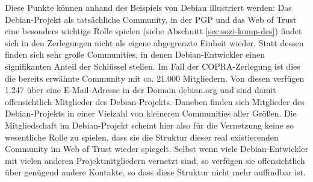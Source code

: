 Diese Punkte können anhand des Beispiels von Debian illustriert
werden: Das Debian-Projekt als tatsächliche Community, in der PGP
und das Web of Trust eine besonders wichtige Rolle spielen (siehe
Abschnitt \ref{sec:sozi-komp-des}) findet sich in den Zerlegungen
nicht als eigene abgegrenzte Einheit wieder. Statt dessen finden sich
sehr große Communities, in denen Debian-Entwickler einen signifikanten
Anteil der Schlüssel stellen. Im Fall der COPRA-Zerlegung ist dies
die bereits erwähnte Community mit ca. 21.000 Mitgliedern. Von
diesen verfügen 1.247 über eine E-Mail-Adresse in der Domain
debian.org und sind damit offensichtlich Mitglieder des
Debian-Projekts. Daneben finden sich Mitglieder des Debian-Projekts in
einer Vielzahl von kleineren Communities aller Größen. Die
Mitgliedschaft im Debian-Projekt scheint hier also für die
Vernetzung keine so wesentliche Rolle zu spielen, dass sie die
Struktur dieser real existierenden Community im Web of Trust
wieder spiegelt. Selbst wenn viele Debian-Entwickler mit vielen anderen
Projektmitgliedern vernetzt sind, so verfügen sie offensichtlich
über genügend andere Kontakte, so dass diese Struktur nicht mehr
auffindbar ist.


